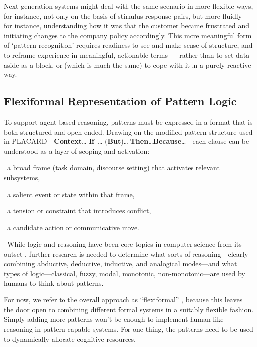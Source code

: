 \documentclass[acmlarge,timestamp]{acmart}
\providecommand{\tightlist}{%
  \setlength{\itemsep}{0pt}\setlength{\parskip}{0pt}}
\begin{document}
{Next-generation systems might deal with the same scenario in more flexible ways, for instance, not only on the basis of stimulus-response pairs, but more fluidly---for instance, understanding how it was that the customer became frustrated and initiating changes to the company policy accordingly. This more meaningful form of `pattern recognition' requires readiness to see and make sense of structure, and to reframe experience in meaningful, actionable terms --- rather than to set data aside as a block, or (which is much the same) to cope with it in a purely reactive way.

\subsection{Flexiformal Representation of Pattern Logic}

{To support agent-based reasoning, patterns must be expressed in a
format that is both structured and open-ended. Drawing on the modified
pattern structure used in PLACARD---\textbf{Context}{\ldots{} }\textbf{If}{~\ldots{} }{(\textbf{But})}{\ldots{}
}\textbf{Then}{\ldots{}}\textbf{Because}{\ldots{}}---each clause can be understood as a layer of scoping and activation:}

\smallskip
\begin{description}
\tightlist
\item[Context:]{~a broad frame (task domain, discourse setting) that
  activates relevant subsystems,}
\item[If condition:]{~a salient event or state within that frame,}
\item[But:]{~a tension or constraint that introduces conflict,}
\item[Then:]{~a candidate action or communicative move.}
\item[Because:]{~}While logic and reasoning have been core topics in
  computer science from its outset \cite{sowa-logic}, further research
  is needed to determine what sorts of reasoning---clearly combining
  abductive, deductive, inductive, and analogical modes---and what
  types of logic---classical, fuzzy, modal, monotonic,
  non-monotonic---are used by humans to think about patterns.
\end{description}

For now, we refer to the overall approach as ``flexiformal''
\cite{6481008}, because this leaves the door open to combining
different formal systems in a suitably flexible fashion. Simply adding
more patterns won't be enough to implement human-like reasoning in
pattern-capable systems.  For one thing, the patterns need to be used
to dynamically allocate cognitive resources.

}
\end{document}
